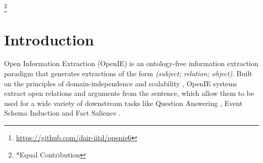 \documentclass[11pt,a4paper]{article}
\title{\ztitle}
\author{
  Keshav Kolluru\textsuperscript{1*}, Vaibhav Adlakha\textsuperscript{1*}, Samarth Aggarwal\textsuperscript{1}, \\  \textbf{Mausam}\textsuperscript{1}, and \textbf{Soumen Chakrabarti}\textsuperscript{2}\\
  \textsuperscript{1} Indian Institute of Technology Delhi\\
  \texttt{keshav.kolluru@gmail.com, vaibhavadlakha95@gmail.com} \\
  \texttt{samarth.aggarwal.2510@gmail.com, mausam@cse.iitd.ac.in} \\
  \textsuperscript{2} Indian Institute of Technology Bombay\\
  \texttt{soumen@cse.iitb.ac.in}
}
\date{}
\newcommand{\shortname}{{\scshape IGL}}
\newcommand{\longname}{Iterative Grid Labeling}
\newcommand\blfootnote[1]{\begingroup
  \renewcommand\thefootnote{}\footnote{#1}\addtocounter{footnote}{-1}\endgroup
}
\begin{document}
\maketitle
\blfootnote{*Equal Contribution}

\begin{abstract}




A recent state-of-the-art neural open information extraction (OpenIE) system generates extractions iteratively, requiring repeated encoding of partial outputs. This comes at a significant computational cost. On the other hand, sequence labeling approaches for OpenIE are much faster, but worse in extraction quality. In this paper, we bridge this trade-off by presenting an iterative labeling-based system that establishes a new state of the art for OpenIE, while extracting 10 faster. This is achieved through a novel \longname\ (\shortname) architecture, which treats OpenIE as a 2-D grid labeling task. We improve its performance further by applying coverage (soft) constraints on the grid at training time. 

Moreover, on observing that the best OpenIE systems falter at handling coordination structures, our OpenIE system also incorporates a new coordination analyzer built with the same \shortname\ architecture. This \shortname\ based coordination analyzer helps our OpenIE system handle complicated coordination structures, while also establishing a new state of the art on the task of coordination analysis, 
with a 12.3 pts improvement in F1 over previous analyzers.
Our OpenIE system, \textbf{OpenIE6}\footnote{
\url{https://github.com/dair-iitd/openie6}}, beats the previous systems by as much as 4 pts in F1, while being much faster.
%
 \end{abstract}

\section{Introduction}
\label{sec:intro}
Open Information Extraction (OpenIE) is an ontology-free information extraction paradigm that generates extractions of the form \textit{(subject; relation; object)}.  Built on the principles of domain-independence and scalability \cite{mausam16}, OpenIE systems extract open relations and arguments from the sentence, which allow them to be used for a wide variety of downstream tasks like Question Answering \cite{yan&al18, khot&al17}, Event Schema Induction \cite{niranjan&al13} and Fact Salience \cite{marco&al18}.
\end{document}

